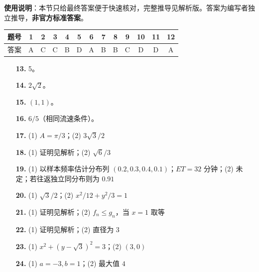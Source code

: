 
\begin{gknotice}
\textbf{使用说明}：本节只给最终答案便于快速核对，完整推导见解析版。答案为编写者独立推导，\textbf{非官方标准答案}。
\end{gknotice}

\begin{center}\begin{tabular}{ccccccccccccc}
\toprule
题号 & 1 & 2 & 3 & 4 & 5 & 6 & 7 & 8 & 9 & 10 & 11 & 12 \\
\midrule
答案 & A & C & C & B & D & A & B & B & C & D & D & A \\
\bottomrule
\end{tabular}\end{center}

\begin{itemize}[leftmargin=2.6em]
  \item[\textbf{13.}] 5。
  \item[\textbf{14.}] $2\sqrt2$。
  \item[\textbf{15.}] $(1,1)$。
  \item[\textbf{16.}] $6/5$（相同流速条件）。
\end{itemize}

\begin{itemize}[leftmargin=2.6em]
  \item[\textbf{17.}] (1) $A=\pi/3$；(2) $3\sqrt3/2$
  \item[\textbf{18.}] (1) 证明见解析；(2) $\sqrt6/3$
  \item[\textbf{19.}] (1) 以样本频率估计分布列 $(0.2,0.3,0.4,0.1)$；$ET=32$ 分钟；(2) 未定；若往返独立同分布则为 $0.91$
  \item[\textbf{20.}] (1) $\sqrt3/2$；(2) $x^2/12+y^2/3=1$
  \item[\textbf{21.}] (1) 证明见解析；(2) $f_n\le g_n$，当 $x=1$ 取等
  \item[\textbf{22.}] (1) 证明见解析；(2) 直径为 $3$
  \item[\textbf{23.}] (1) $x^2+(y-\sqrt3)^2=3$；(2) $(3,0)$
  \item[\textbf{24.}] (1) $a=-3,b=1$；(2) 最大值 $4$
\end{itemize}
